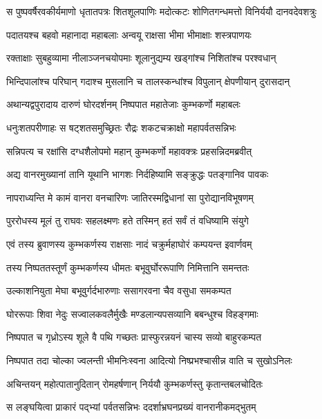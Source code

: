 \twolineshloka
{स पुष्पवर्षैरवकीर्यमाणो धृतातपत्रः शितशूलपाणिः}
{मदोत्कटः शोणितगन्धमत्तो विनिर्ययौ दानवदेवशत्रुः} %

\twolineshloka
{पदातयश्च बहवो महानादा महाबलाः}
{अन्वयू राक्षसा भीमा भीमाक्षाः शस्त्रपाणयः} %

\twolineshloka
{रक्ताक्षाः सुबहुव्यामा नीलाञ्जनचयोपमाः}
{शूलानुद्यम्य खड्गांश्च निशितांश्च परश्वधान्} %

\twolineshloka
{भिन्दिपालांश्च परिघान् गदाश्च मुसलानि च}
{तालस्कन्धांश्च विपुलान् क्षेपणीयान् दुरासदान्} %

\twolineshloka
{अथान्यद्वपुरादाय दारुणं घोरदर्शनम्}
{निष्पपात महातेजाः कुम्भकर्णो महाबलः} %

\twolineshloka
{धनुःशतपरीणाहः स षट्शतसमुच्छ्रितः}
{रौद्रः शकटचक्राक्षो महापर्वतसन्निभः} %

\twolineshloka
{सन्निपत्य च रक्षांसि दग्धशैलोपमो महान्}
{कुम्भकर्णो महावक्त्रः प्रहसन्निदमब्रवीत्} %

\twolineshloka
{अद्य वानरमुख्यानां तानि यूथानि भागशः}
{निर्दहिष्यामि सङ्क्रुद्धः पतङ्गानिव पावकः} %

\twolineshloka
{नापराध्यन्ति मे कामं वानरा वनचारिणः}
{जातिरस्मद्विधानां सा पुरोद्यानविभूषणम्} %

\twolineshloka
{पुररोधस्य मूलं तु राघवः सहलक्ष्मणः}
{हते तस्मिन् हतं सर्वं तं वधिष्यामि संयुगे} %

\twolineshloka
{एवं तस्य ब्रुवाणस्य कुम्भकर्णस्य राक्षसाः}
{नादं चक्रुर्महाघोरं कम्पयन्त इवार्णवम्} %

\twolineshloka
{तस्य निष्पततस्तूर्णं कुम्भकर्णस्य धीमतः}
{बभूवुर्घोररूपाणि निमित्तानि समन्ततः} %

\twolineshloka
{उल्काशनियुता मेघा बभूवुर्गर्दभारुणाः}
{ससागरवना चैव वसुधा समकम्पत} %

\twolineshloka
{घोररूपाः शिवा नेदुः सज्वालकवलैर्मुखैः}
{मण्डलान्यपसव्यानि बबन्धुश्च विहङ्गमाः} %

\twolineshloka
{निष्पपात च गृध्रोऽस्य शूले वै पथि गच्छतः}
{प्रास्फुरन्नयनं चास्य सव्यो बाहुरकम्पत} %

\twolineshloka
{निष्पपात तदा चोल्का ज्वलन्ती भीमनिःस्वना}
{आदित्यो निष्प्रभश्चासीन्न वाति च सुखोऽनिलः} %

\twolineshloka
{अचिन्तयन् महोत्पातानुदितान् रोमहर्षणान्}
{निर्ययौ कुम्भकर्णस्तु कृतान्तबलचोदितः} %

\twolineshloka
{स लङ्घयित्वा प्राकारं पद्भ्यां पर्वतसन्निभः}
{ददर्शाभ्रघनप्रख्यं वानरानीकमद्भुतम्} %

